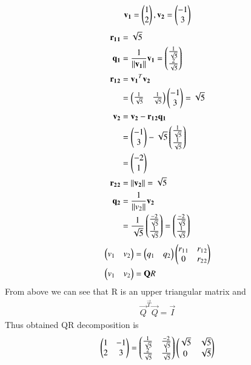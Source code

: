 \documentclass[journal,12pt,twocolumn]{IEEEtran}
\begin{document}
\begin{enumerate}
\begin{align}
\mathbf{v_1}=\begin{pmatrix}1 \\ 2\end{pmatrix},
\mathbf{v_2}=\begin{pmatrix}-1 \\ 3\end{pmatrix}
\end{align}
\begin{align}
\mathbf{r_1{}_1}&=\sqrt{5}
\\
\mathbf{q_1}&=\frac{1}{\left\lVert\mathbf{v_1}\right\rVert}{\mathbf{v_1}}=\begin{pmatrix}\frac{1}{\sqrt{5}} \\ \frac{2}{\sqrt{5}}\end{pmatrix}
\\
\mathbf{r_1{}_2}&=\mathbf{v_1}^{T}{\mathbf{v_2}} 
\\
&=\begin{pmatrix}\frac{1}{\sqrt{5}} & \frac{1}{\sqrt{5}}\end{pmatrix}\begin{pmatrix}-1 \\ 3 \end{pmatrix}=\sqrt{5}
\\
\mathbf{v_2}&=\mathbf{v_2}-\mathbf{r_1{}_2}\mathbf{q_1} \\
&=\begin{pmatrix}-1 \\ 3\end{pmatrix}-{\sqrt{5}}\begin{pmatrix}\frac{1}{\sqrt{5}} \\ \frac{1}{\sqrt{5}}\end{pmatrix}
\\
&=\begin{pmatrix}-2 \\ 1\end{pmatrix}
\\
\mathbf{r_2{}_2}&=\left\lVert\mathbf{v_2}\right\rVert=\sqrt{5}
\\
\mathbf{q_2}&=\frac{1}{\left\lVert v_2\right\rVert}\mathbf{v_2}
\\
&=\frac{1}{\sqrt{5}}\begin{pmatrix}\frac{-2}{\sqrt{5}} \\ \frac{1}{\sqrt{5}}\end{pmatrix}=\begin{pmatrix}\frac{-2}{\sqrt{5}}\\{\frac{1}{\sqrt{5}}}\end{pmatrix}
\end{align}
\begin{align}
\begin{pmatrix}v_1 & v_2\end{pmatrix}&=\begin{pmatrix}q_1 & q_2\end{pmatrix}\begin{pmatrix}r_1{}_1 & r_1{}_2 \\ 0 & r_2{}_2\end{pmatrix}
\\
\begin{pmatrix}v_1 & v_2\end{pmatrix}&=\mathbf{Q}{R}
\end{align}
From above we can see that R is an upper triangular matrix and 
\begin{align}
\vec{Q}^{\vec{T}}{\vec{Q}}=\Vec{I}
\end{align}
Thus obtained QR decomposition is 
\begin{align}
\begin{pmatrix}1 & -1 \\ 2 & 3\end{pmatrix}=\begin{pmatrix}\frac{1}{\sqrt{5}} & \frac{-2}{\sqrt{5}} \\ \frac{2}{\sqrt{5}} & \frac{1}{\sqrt{5}}\end{pmatrix}\begin{pmatrix}\sqrt{5} & \sqrt{5} \\ 0 & \sqrt{5}\end{pmatrix}
\end{align}
\end{enumerate}
\end{document}
